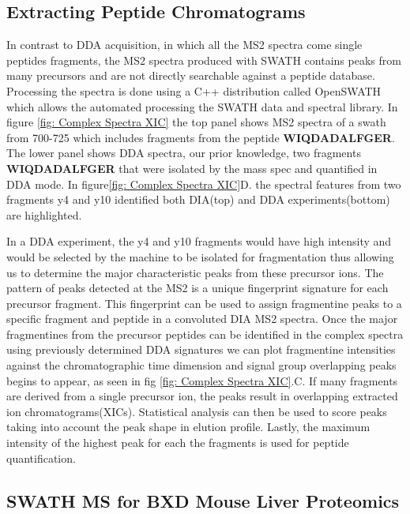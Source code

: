 \documentclass[a4paper,11pt,twoside]{book}
\begin{document}
	\subsection{Extracting Peptide Chromatograms}
	
	In contrast to DDA acquisition, in which all the MS2 spectra come single peptides fragments, the MS2 spectra produced with SWATH contains peaks from many precursors and are not directly searchable against a peptide database. Processing the spectra is done using a C++ distribution called OpenSWATH which allows the automated processing the SWATH data and spectral library\citep{Rost2014OpenSWATHData}. In figure \ref{fig: Complex Spectra XIC} the top panel shows MS2 spectra of a swath from 700-725 which includes fragments from the peptide \textbf{WIQDADALFGER}. The lower panel shows DDA spectra, our prior knowledge, two fragments \textbf{WIQDADALFGER} that were isolated by the mass spec and quantified in DDA mode. In figure\ref{fig: Complex Spectra XIC}D. the spectral features from two fragments y4 and y10 identified both DIA(top) and DDA experiments(bottom) are highlighted. 
	
    In a DDA experiment, the y4 and y10 fragments would have high intensity and would be selected by the machine to be isolated for fragmentation thus allowing us to determine the major characteristic peaks from these precursor ions. The pattern of peaks detected at the MS2 is a unique fingerprint signature for each precursor fragment\citep{Gillet2012TargetedAnalysis}. This fingerprint can be used to assign fragmentine peaks to a specific fragment and peptide in a convoluted DIA MS2 spectra. Once the major fragmentines from the precursor peptides can be identified in the complex spectra using previously determined DDA signatures we can plot fragmentine intensities against the chromatographic time dimension and signal group overlapping peaks begins to appear, as seen in fig \ref{fig: Complex Spectra XIC}.C. If many fragments are derived from a single precursor ion, the peaks result in overlapping extracted ion chromatograms(XICs). Statistical analysis can then be used to score peaks taking into account the peak shape in elution profile. Lastly, the maximum intensity of the highest peak for each the fragments is used for peptide quantification. 
	
	\subsection{SWATH MS for BXD Mouse Liver Proteomics}
	
\end{document}
